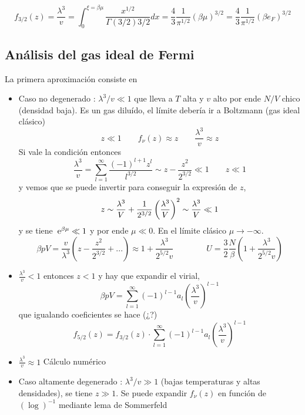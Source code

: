 \documentclass[10pt,oneside]{CBFT_book}
\begin{document}
\[
	f_{3/2}(z) = \frac{\lambda^3}{v} = \int_0^{\xi = \beta\mu } \frac{x^{1/2}}{\Gamma(3/2)3/2}dx =
	\frac{4}{3} \frac{1}{\pi^{1/2}} ( \beta\mu )^{3/2} = 
	\frac{4}{3} \frac{1}{\pi^{1/2}} ( \beta e_F )^{3/2}
\]


\subsection{Análisis del gas ideal de Fermi}

La primera aproximación consiste en 
\begin{itemize}
 \item Caso no degenerado : $ \lambda^3 / v  \ll 1 $  que lleva a $ T $ alta y $ v $ alto
 por ende $ N/V $ chico (densidad baja).
 Es un gas diluído, el límite debería ir a Boltzmann (gas ideal clásico)
 \[	
	z \ll 1 \qquad f_\nu(z) \approx z \qquad \frac{\lambda^3}{v} \approx z
 \]
 Si vale la condición entonces 
 \[
	\frac{\lambda^3}{v} = \sum_{l=1}^\infty \frac{(-1)^{l+1} z^l }{l^{3/2}} 
	\sim z - \frac{z^2}{2^{3/2}} \ll 1 \qquad z \ll 1
 \]
 y vemos que se puede invertir para conseguir la expresión de $z$,
 \[
	z \sim \frac{\lambda^3}{V} + \frac{1}{2^{3/2}} \left( \frac{ \lambda^3 }{ V } \right)^2 \sim \frac{\lambda^3}{V} \ll 1
 \]
 y se tiene $ \:\mathrm{e}^{\beta \mu} \ll 1$ y por ende $\mu \ll 0$. En el límite clásico $\mu \to -\infty$.
 \[
	\beta p V = \frac{v}{\lambda^3}\left( z - \frac{z^2}{2^{3/2}} + ... \right) \approx 
	1 + \frac{\lambda^3}{2^{5/2} v} \qquad \qquad 
	U = \frac{3}{2} \frac{N}{\beta}
	\left( 1 + \frac{\lambda^3}{2^{5/2} v} \right)
 \]
 \item $\frac{\lambda^3}{v} < 1 $ entonces $ z < 1 $ y hay que expandir el virial,
 \[
	\beta p V = \sum_{l=1}^\infty (-1)^{l-1} a_l \left(\frac{\lambda^3}{v} \right)^{l-1}
 \]
 que igualando coeficientes se hace (¿?)
 \[
	f_{5/2}(z) = f_{3/2}(z) \cdot \sum_{l=1}^\infty (-1)^{l-1} a_l \left(\frac{\lambda^3}{v} \right)^{l-1}
 \]
 \item $\frac{\lambda^3}{v} \approx 1 $ Cálculo numérico
 \item Caso altamente degenerado : $ \lambda^3 / v \gg 1 $ (bajas temperaturas y altas
 densidades), se tiene $ z \gg 1 $. 
 Se puede expandir $ f_\nu(z) $ en función de $ (\log )^{-1} $ mediante lema de Sommerfeld

\end{itemize}
\end{document}
